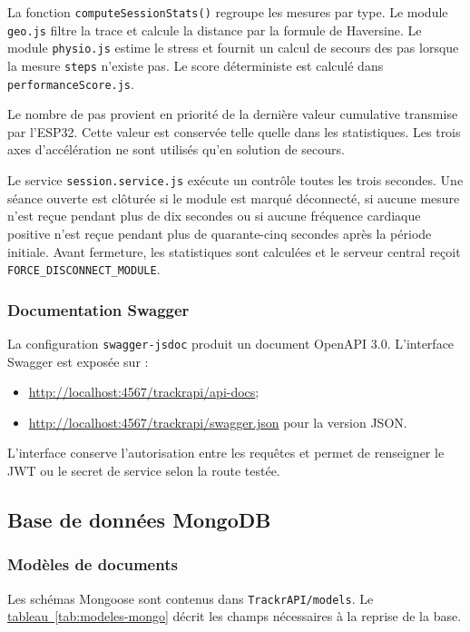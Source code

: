 \documentclass[11pt,a4paper]{article}
\newcommand{\code}[1]{\nolinkurl{#1}}
\newcommand{\tabref}[1]{\hyperref[#1]{tableau~\ref*{#1}}}
\begin{document}
La fonction \code{computeSessionStats()} regroupe les mesures par type. Le module \code{geo.js} filtre la trace et calcule la distance par la formule de Haversine. Le module \code{physio.js} estime le stress et fournit un calcul de secours des pas lorsque la mesure \code{steps} n'existe pas. Le score déterministe est calculé dans \code{performanceScore.js}.

Le nombre de pas provient en priorité de la dernière valeur cumulative transmise par l'ESP32. Cette valeur est conservée telle quelle dans les statistiques. Les trois axes d'accélération ne sont utilisés qu'en solution de secours.

Le service \code{session.service.js} exécute un contrôle toutes les trois secondes. Une séance ouverte est clôturée si le module est marqué déconnecté, si aucune mesure n'est reçue pendant plus de dix secondes ou si aucune fréquence cardiaque positive n'est reçue pendant plus de quarante-cinq secondes après la période initiale. Avant fermeture, les statistiques sont calculées et le serveur central reçoit \code{FORCE_DISCONNECT_MODULE}.

\subsubsection{Documentation Swagger}

La configuration \code{swagger-jsdoc} produit un document OpenAPI 3.0. L'interface Swagger est exposée sur :

\begin{itemize}
  \item \url{http://localhost:4567/trackrapi/api-docs};
  \item \url{http://localhost:4567/trackrapi/swagger.json} pour la version JSON.
\end{itemize}

L'interface conserve l'autorisation entre les requêtes et permet de renseigner le JWT ou le secret de service selon la route testée.

\subsection{Base de données MongoDB}

\subsubsection{Modèles de documents}

Les schémas Mongoose sont contenus dans \code{TrackrAPI/models}. Le \tabref{tab:modeles-mongo} décrit les champs nécessaires à la reprise de la base.
\end{document}
